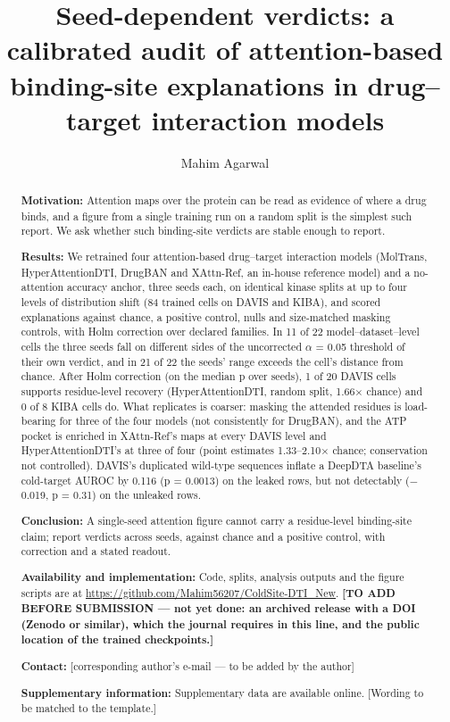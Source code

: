 \documentclass[
  11pt,
]{article}
\title{Seed-dependent verdicts: a calibrated audit of attention-based binding-site explanations in drug--target interaction models}
\author{Mahim Agarwal}
\date{}
\begin{document}
\maketitle
\begin{abstract}
\textbf{Motivation:} Attention maps over the protein can be read as evidence of where a drug binds, and a figure from a single training run on a random split is the simplest such report. We ask whether such binding-site verdicts are stable enough to report.

\textbf{Results:} We retrained four attention-based drug--target interaction models (MolTrans, HyperAttentionDTI, DrugBAN and XAttn-Ref, an in-house reference model) and a no-attention accuracy anchor, three seeds each, on identical kinase splits at up to four levels of distribution shift (84 trained cells on DAVIS and KIBA), and scored explanations against chance, a positive control, nulls and size-matched masking controls, with Holm correction over declared families. In 11 of 22 model--dataset--level cells the three seeds fall on different sides of the uncorrected $\alpha$ = 0.05 threshold of their own verdict, and in 21 of 22 the seeds' range exceeds the cell's distance from chance. After Holm correction (on the median p over seeds), 1 of 20 DAVIS cells supports residue-level recovery (HyperAttentionDTI, random split, 1.66$\times$ chance) and 0 of 8 KIBA cells do. What replicates is coarser: masking the attended residues is load-bearing for three of the four models (not consistently for DrugBAN), and the ATP pocket is enriched in XAttn-Ref's maps at every DAVIS level and HyperAttentionDTI's at three of four (point estimates 1.33--2.10$\times$ chance; conservation not controlled). DAVIS's duplicated wild-type sequences inflate a DeepDTA baseline's cold-target AUROC by 0.116 (p = 0.0013) on the leaked rows, but not detectably ($-$0.019, p = 0.31) on the unleaked rows.

\textbf{Conclusion:} A single-seed attention figure cannot carry a residue-level binding-site claim; report verdicts across seeds, against chance and a positive control, with correction and a stated readout.

\textbf{Availability and implementation:} Code, splits, analysis outputs and the figure scripts are at \url{https://github.com/Mahim56207/ColdSite-DTI_New}. \textbf{{[}TO ADD BEFORE SUBMISSION --- not yet done: an archived release with a DOI (Zenodo or similar), which the journal requires in this line, and the public location of the trained checkpoints.{]}}

\textbf{Contact:} {[}corresponding author's e-mail --- to be added by the author{]}

\textbf{Supplementary information:} Supplementary data are available online. {[}Wording to be matched to the template.{]}
\end{abstract}
\end{document}
